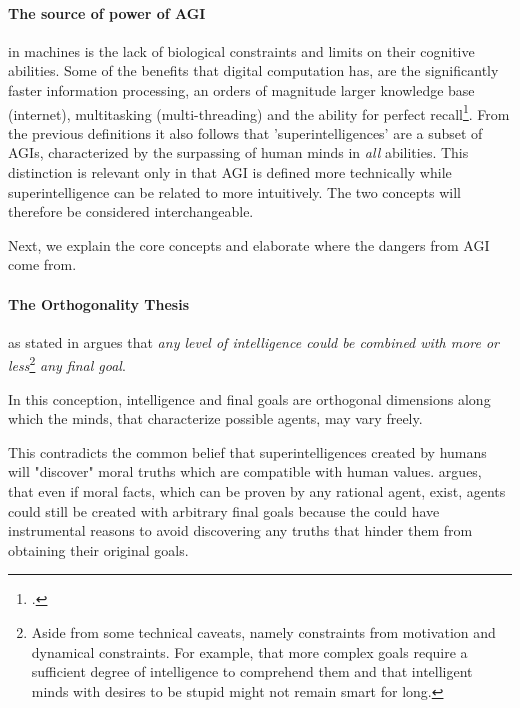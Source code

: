 \documentclass[12pt, a4paper]{article}
\begin{document}
			\paragraph{The source of power of AGI}
				in machines is the lack of biological constraints and limits on their cognitive abilities.
				Some of the benefits that digital computation has, are the significantly faster information processing, an orders of magnitude larger knowledge base (internet), multitasking (multi-threading) and the ability for perfect recall\footcite{bostrom2014superintelligence}.
				From the previous definitions it also follows that 'superintelligences' are a subset of AGIs, characterized by the surpassing of human minds in \textit{all} abilities.
				This distinction is relevant only in that AGI is defined more technically while superintelligence can be related to more intuitively.
				The two concepts will therefore be considered interchangeable.
				
				Next, we explain the core concepts and elaborate where the dangers from AGI come from.

			\paragraph[Orthogonality Thesis]{The Orthogonality Thesis}
				as stated in \cite{bostrom2012superintelligent} argues that \textit{any level of intelligence could be combined with more or less}\footnote{Aside from some technical caveats, namely constraints from motivation and dynamical constraints. For example, that more complex goals require a sufficient degree of intelligence to comprehend them and that intelligent minds with desires to be stupid might not remain smart for long.} \textit{any final goal}.
				
				In this conception, intelligence and final goals are orthogonal dimensions along which the minds, that characterize possible agents, may vary freely.
				
				This contradicts the common belief that superintelligences created by humans will "discover" moral truths which are compatible with human values.			
				\textcite{armstrong2013general} argues, that even if moral facts, which can be proven by any rational agent, exist, agents could still be created with arbitrary final goals because the could have instrumental reasons to avoid discovering any truths that hinder them from obtaining their original goals.
			
\end{document}
